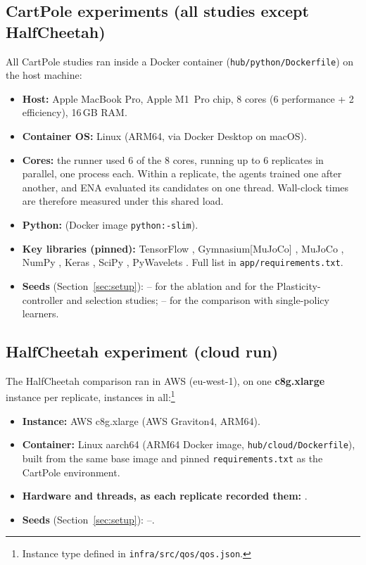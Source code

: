 \subsection*{CartPole experiments (all studies except HalfCheetah)}
All CartPole studies ran inside a Docker container (\texttt{hub/python/Dockerfile}) on the host machine:
\begin{itemize}
  \item \textbf{Host:} Apple MacBook Pro, Apple M1~Pro chip, 8 cores (6 performance + 2 efficiency), 16\,GB RAM.
  \item \textbf{Container OS:} Linux (ARM64, via Docker Desktop on macOS).
  \item \textbf{Cores:} the runner used 6 of the 8 cores, running up to 6 replicates in parallel, one process each. Within a replicate, the agents trained one after another, and ENA evaluated its candidates on one thread. Wall-clock times are therefore measured under this shared load.
  \item \textbf{Python:}  (Docker image \texttt{python:-slim}).
  \item \textbf{Key libraries (pinned):} TensorFlow , Gymnasium[MuJoCo] , MuJoCo , NumPy , Keras , SciPy , PyWavelets . Full list in \texttt{app/requirements.txt}.
  \item \textbf{Seeds} (Section~\ref{sec:setup}): -- for the ablation and for the Plasticity-controller and selection studies; -- for the comparison with single-policy learners.
\end{itemize}

\subsection*{HalfCheetah experiment (cloud run)}
The HalfCheetah comparison ran in AWS (eu-west-1), on one \textbf{c8g.xlarge} instance per replicate,  instances in all:\footnote{Instance type defined in \texttt{infra/src/qos/qos.json}.}
\begin{itemize}
  \item \textbf{Instance:} AWS c8g.xlarge (AWS Graviton4, ARM64).
  \item \textbf{Container:} Linux aarch64 (ARM64 Docker image, \texttt{hub/cloud/Dockerfile}), built from the same base image and pinned \texttt{requirements.txt} as the CartPole environment.
  \item \textbf{Hardware and threads, as each replicate recorded them:} .
  \item \textbf{Seeds} (Section~\ref{sec:setup}): --.
\end{itemize}

